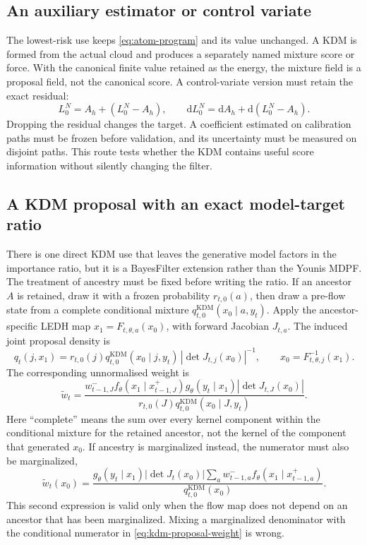 \documentclass[11pt]{article}
\newcommand{\dd}{\mathrm{d}}
\newcommand{\KDM}{\ensuremath{\mathrm{KDM}}}
\begin{document}
\subsection{An auxiliary estimator or control variate}

The lowest-risk use keeps \eqref{eq:atom-program} and its value unchanged.
A KDM is formed from the actual cloud and produces a separately named mixture
score or force.  With the canonical finite value retained as the energy, the
mixture field is a proposal field, not the canonical score.  A control-variate
version must retain the exact residual:
\begin{equation}
 L_0^N=A_h+\left(L_0^N-A_h\right),\qquad
 \dd L_0^N=\dd A_h+\dd\left(L_0^N-A_h\right).
 \label{eq:residual}
\end{equation}
Dropping the residual changes the target.  A coefficient estimated on
calibration paths must be frozen before validation, and its uncertainty must
be measured on disjoint paths.  This route tests whether the KDM contains
useful score information without silently changing the filter.

\subsection{A KDM proposal with an exact model-target ratio}

There is one direct KDM use that leaves the generative model factors in the
importance ratio, but it is a BayesFilter extension rather than the Younis
MDPF.  The treatment of ancestry must be fixed before writing the ratio.  If
an ancestor $A$ is retained, draw it with a frozen probability $r_{t,0}(a)$,
then draw a pre-flow state from a complete conditional mixture
$q^{\KDM}_{t,0}(x_0\mid a,y_t)$.  Apply the ancestor-specific LEDH map
$x_1=F_{t,\theta,a}(x_0)$, with forward Jacobian $J_{t,a}$.  The induced joint
proposal density is
\begin{equation}
 q_t(j,x_1)
 = r_{t,0}(j)q^{\KDM}_{t,0}(x_0\mid j,y_t)
   \,|\det J_{t,j}(x_0)|^{-1},
 \qquad x_0=F_{t,\theta,j}^{-1}(x_1).
 \label{eq:kdm-proposal-density}
\end{equation}
The corresponding unnormalised weight is
\begin{equation}
 \widetilde w_t
 = \frac{w^-_{t-1,J}
     f_\theta(x_1\mid x^+_{t-1,J})
     g_\theta(y_t\mid x_1)
     |\det J_{t,J}(x_0)|}
    {r_{t,0}(J)q^{\KDM}_{t,0}(x_0\mid J,y_t)}.
 \label{eq:kdm-proposal-weight}
\end{equation}
Here ``complete'' means the sum over every kernel component within the
conditional mixture for the retained ancestor, not the kernel of the component
that generated $x_0$.  If ancestry is marginalized instead, the numerator must
also be marginalized,
\begin{equation}
 \widetilde w_t(x_0)
 =\frac{g_\theta(y_t\mid x_1)|\det J_t(x_0)|
   \sum_a w^-_{t-1,a}f_\theta(x_1\mid x^+_{t-1,a})}
  {q^{\KDM}_{t,0}(x_0)}.
 \label{eq:kdm-proposal-marginal-weight}
\end{equation}
This second expression is valid only when the flow map does not depend on an
ancestor that has been marginalized.  Mixing a marginalized denominator with
the conditional numerator in \eqref{eq:kdm-proposal-weight} is wrong.
\end{document}
